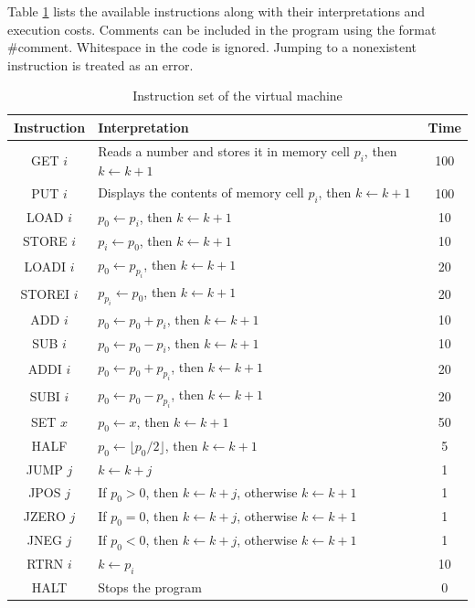 \documentclass{article}
\begin{document}
Table \ref{tab:instructions} lists the available instructions along with their interpretations and execution costs. Comments can be included in the program using the format \#comment. Whitespace in the code is ignored. Jumping to a nonexistent instruction is treated as an error.

\begin{table}[h]
\centering
\renewcommand{\arraystretch}{1.4}
\begin{tabular}{|c|>{\raggedright\arraybackslash}m{9cm}|c|}
\hline
\textbf{Instruction} & \textbf{Interpretation} & \textbf{Time} \\
\hline
GET $i$  & Reads a number and stores it in memory cell $p_i$, then $k \gets k + 1$ & 100 \\
PUT $i$  & Displays the contents of memory cell $p_i$, then $k \gets k + 1$ & 100 \\
\hline
LOAD $i$  & $p_0 \gets p_i$, then $k \gets k + 1$ & 10 \\
STORE $i$  & $p_i \gets p_0$, then $k \gets k + 1$ & 10 \\
LOADI $i$  & $p_0 \gets p_{p_i}$, then $k \gets k + 1$ & 20 \\
STOREI $i$  & $p_{p_i} \gets p_0$, then $k \gets k + 1$ & 20 \\
\hline
ADD $i$  & $p_0 \gets p_0 + p_i$, then $k \gets k + 1$ & 10 \\
SUB $i$  & $p_0 \gets p_0 - p_i$, then $k \gets k + 1$ & 10 \\
ADDI $i$  & $p_0 \gets p_0 + p_{p_i}$, then $k \gets k + 1$ & 20 \\
SUBI $i$  & $p_0 \gets p_0 - p_{p_i}$, then $k \gets k + 1$ & 20 \\
\hline
SET $x$  & $p_0 \gets x$, then $k \gets k + 1$ & 50 \\
HALF  & $p_0 \gets \lfloor p_0 / 2 \rfloor$, then $k \gets k + 1$ & 5 \\
\hline
JUMP $j$  & $k \gets k + j$ & 1 \\
JPOS $j$  & If $p_0 > 0$, then $k \gets k + j$, otherwise $k \gets k + 1$ & 1 \\
JZERO $j$  & If $p_0 = 0$, then $k \gets k + j$, otherwise $k \gets k + 1$ & 1 \\
JNEG $j$  & If $p_0 < 0$, then $k \gets k + j$, otherwise $k \gets k + 1$ & 1 \\
\hline
RTRN $i$  & $k \gets p_i$ & 10 \\
HALT  & Stops the program & 0 \\
\hline
\end{tabular}
\caption{Instruction set of the virtual machine}
\label{tab:instructions}
\end{table}
\end{document}

